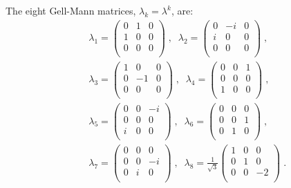 \documentclass[final,5p,times,twocolumn,sort,compress]{elsarticle}
\begin{document}
The eight Gell-Mann matrices, $\lambda_k = \lambda^k$, are:
\begin{eqnarray}
 &&
 \lambda_1
 =
 \left(\begin{array}{ccc}
  0 & 1 & 0 \\
  1 & 0 & 0 \\
  0 & 0 & 0 \\
 \end{array}\right)
 \;, \;\;
 \lambda_2
 =
 \left(\begin{array}{ccc}
  0 & -i & 0 \\
  i &  0 & 0 \\
  0 &  0 & 0 \\
 \end{array}\right)
 \;, \nonumber \\
 &&
 \lambda_3
 =
 \left(\begin{array}{ccc}
  1 &  0 & 0 \\
  0 & -1 & 0 \\
  0 &  0 & 0 \\
 \end{array}\right)
 \;, \;\;
 \lambda_4
 =
 \left(\begin{array}{ccc}
  0 & 0 & 1 \\
  0 & 0 & 0 \\
  1 & 0 & 0 \\
 \end{array}\right)
 \;,  \\
 &&
 \lambda_5
 =
 \left(\begin{array}{ccc}
  0 & 0 & -i \\
  0 & 0 &  0 \\
  i & 0 &  0 \\
 \end{array}\right)
 \;, \;\;
 \lambda_6
 =
 \left(\begin{array}{ccc}
  0 & 0 & 0 \\
  0 & 0 & 1 \\
  0 & 1 & 0 \\
 \end{array}\right)
 \;, \nonumber \\
 &&
 \lambda_7
 =
 \left(\begin{array}{ccc}
  0 & 0 &  0 \\
  0 & 0 & -i \\
  0 & i &  0 \\
 \end{array}\right)
 \;, \;\;
 \lambda_8
 =
 \frac{1}{\sqrt{3}}
 \left(\begin{array}{ccc}
  1 & 0 &  0 \\
  0 & 1 &  0 \\
  0 & 0 & -2 \\
 \end{array}\right)
 \;. \nonumber
\end{eqnarray}
\end{document}
